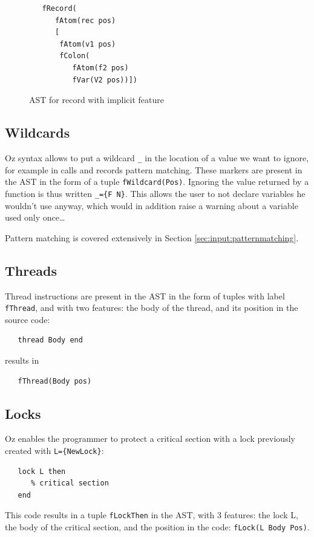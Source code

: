 \documentclass[a4paper]{memoir}
\begin{document}
\begin{figure}[h]
\begin{lstlisting}
   fRecord(
      fAtom(rec pos)
      [
       fAtom(v1 pos)
       fColon(
          fAtom(f2 pos)
          fVar(V2 pos))])
\end{lstlisting}
\caption{AST for record with implicit feature}
\label{fig:astfeature}
\end{figure}



\subsection{Wildcards}\label{sec:input:wildcard}
Oz syntax allows to put a wildcard \lstinline!_! in the location of a value we want to ignore, for example in calls and records pattern matching. These markers are present in the AST in the form of a tuple \lstinline!fWildcard(Pos)!.
Ignoring the value returned by a function is thus written \lstinline!_={F N}!. 
This allows the user to not declare variables he wouldn't use anyway, which would in addition raise a warning about a variable used only once\ldots

Pattern matching is covered extensively in Section \ref{sec:input:patternmatching}.

\subsection{Threads}
Thread instructions are present in the AST in the form of tuples with label \lstinline!fThread!, and with two features: the body of the thread, and its position in the source code:
\begin{lstlisting}
   thread Body end
\end{lstlisting}
results in
\begin{lstlisting}
   fThread(Body pos)
\end{lstlisting}
\subsection{Locks}\label{sec:input:locks}
Oz enables the programmer to protect a critical section with a lock previously created with \lstinline!L={NewLock}!:
\begin{lstlisting}
   lock L then
      % critical section
   end
\end{lstlisting}

This code results in a tuple \lstinline!fLockThen! in the AST, with 3 features: the lock L,
the body of the critical section, and the position in the code:
\lstinline!fLock(L Body Pos)!.
\end{document}

